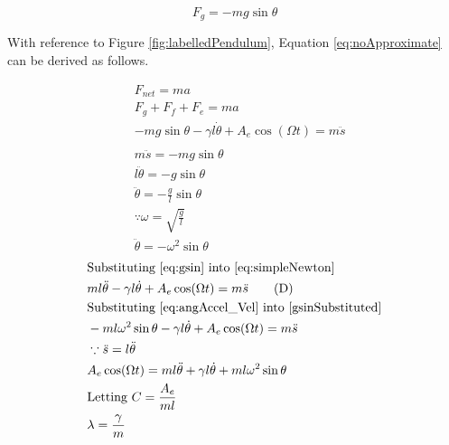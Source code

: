 \documentclass[letterpaper, 12pt]{article}
\begin{document}
\begin{equation}
    F_g = -mg\sin\theta
\end{equation}


With reference to Figure \ref*{fig:labelledPendulum}, Equation \ref*{eq:noApproximate}
can be derived as follows.

\begingroup
\allowdisplaybreaks
\begin{paracol}{2}
    \begin{align*}
         & F_{net}                                                   = ma
        \\
         & F_g + F_f + F_e                                           = ma
        \\
         & -mg\sin\theta - \gamma l\dot\theta + A_e \cos (\Omega t)  = m\ddot s \tag{A} \label{eq:simpleNewton}
        \\
        \\
         & m\ddot s                                                  = -mg \sin\theta
        \\
         & l\ddot \theta                                             = -g\sin\theta \tag{B} \label{eq:gsin}
        \\
         & \ddot\theta                                               = -\frac{g}{l}\sin\theta
        \\
         & \because \omega                                          = \sqrt{\frac{g}{l}}
        \\
         & \ddot\theta                                               = -\omega^2\sin\theta \tag{C} \label{eq:angAccel_Vel}
    \end{align*}
    \switchcolumn
    \begin{align*}
         & \text{Substituting \ref*{eq:gsin} into \ref*{eq:simpleNewton}}
        \\
         & ml\ddot\theta - \gamma l\dot\theta + A_e \cos (\Omega t)                = m\ddot s \tag{D} \label{gsinSubstituted}
        \\
         & \text{Substituting \ref*{eq:angAccel_Vel} into \ref*{gsinSubstituted}}
        \\
         & -ml\omega^2\sin\theta - \gamma l\dot\theta + A_e \cos (\Omega t)        = m\ddot s
        \\
         & \because \ddot s                                                        = l\ddot \theta
        \\
         & A_e\cos(\Omega t)                                                       = ml\ddot \theta + \gamma l\dot\theta + ml\omega^2\sin\theta
        \\
         & \text{Letting } C                                                       = \frac{A_e}{ml}
        \\
         & \lambda                                                                 = \frac{\gamma}{m}
    \end{align*}
\end{paracol}
\end{document}
